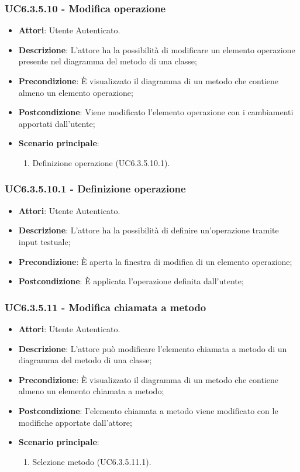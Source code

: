 \subsubsection{UC6.3.5.10 - Modifica operazione} 
\label{sssec:UC6.3.5.10} 
\begin{itemize} 
\item \textbf{Attori}: Utente Autenticato.
\item \textbf{Descrizione}: L'attore ha la possibilità di modificare un elemento operazione presente nel diagramma del metodo di una classe;
\item \textbf{Precondizione}: È visualizzato il diagramma di un metodo che contiene almeno un elemento operazione;
\item \textbf{Postcondizione}: Viene modificato l'elemento operazione con i cambiamenti apportati dall'utente;
\item \textbf{Scenario principale}: \begin{enumerate}\item Definizione operazione (UC6.3.5.10.1). 
 \end{enumerate}
\end{itemize} 
\subsubsection{UC6.3.5.10.1 - Definizione operazione} 
\label{sssec:UC6.3.5.10.1} 
\begin{itemize} 
\item \textbf{Attori}: Utente Autenticato.
\item \textbf{Descrizione}: L'attore ha la possibilità di definire un'operazione tramite input testuale;
\item \textbf{Precondizione}: È aperta la finestra di modifica di un elemento operazione;
\item \textbf{Postcondizione}: È applicata l'operazione definita dall'utente;
\end{itemize} 
\subsubsection{UC6.3.5.11 - Modifica chiamata a metodo} 
\label{sssec:UC6.3.5.11} 
\begin{itemize} 
\item \textbf{Attori}: Utente Autenticato.
\item \textbf{Descrizione}: L'attore può modificare l'elemento chiamata a metodo di un diagramma del metodo di una classe;
\item \textbf{Precondizione}: È visualizzato il diagramma di un metodo che contiene almeno un elemento chiamata a metodo;
\item \textbf{Postcondizione}: I'elemento chiamata a metodo viene modificato con le modifiche apportate dall'attore;
\item \textbf{Scenario principale}: \begin{enumerate}\item Selezione metodo (UC6.3.5.11.1). 
 \end{enumerate}
\end{itemize} 

